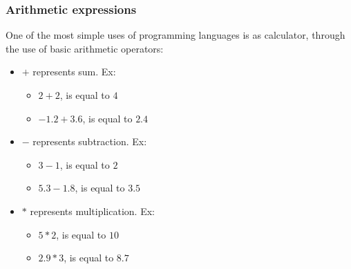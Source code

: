 \documentclass{beamer}
\begin{document}
\begin{frame}
    \frametitle{Arithmetic expressions}
        One of the most simple uses of programming languages is as calculator,
        through the use of basic arithmetic operators:
        \begin{itemize}
            \item $+$ represents sum. Ex:
            \begin{itemize}
                \item $2+2$, is equal to $4$
                \item $-1.2+3.6$, is equal to $2.4$
            \end{itemize}
            \item $-$ represents subtraction. Ex:
            \begin{itemize}
                \item $3-1$, is equal to $2$
                \item $5.3-1.8$, is equal to $3.5$
            \end{itemize}
            \item $*$ represents multiplication. Ex:
            \begin{itemize}
                \item $5*2$, is equal to $10$
                \item $2.9*3$, is equal to $8.7$
            \end{itemize}
        \end{itemize}
\end{frame}
\end{document}
